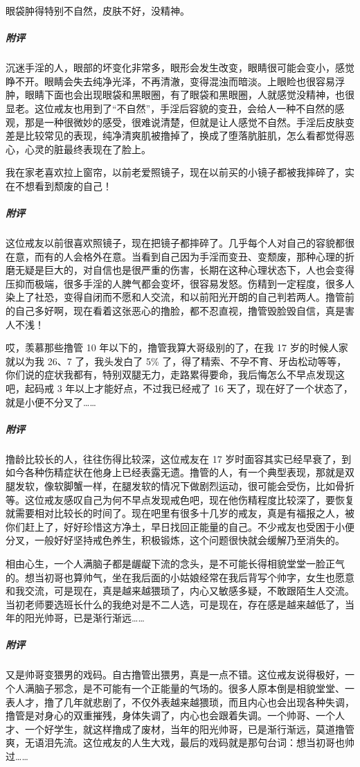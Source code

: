 \begin{case}[变丑]
    眼袋肿得特别不自然，皮肤不好，没精神。
    \subparagraph{附评} 沉迷手淫的人，眼部的坏变化非常多，眼形会发生改变，眼睛很可能会变小，感觉睁不开。眼睛会失去纯净光泽，不再清澈，变得混浊而暗淡。上眼睑也很容易浮肿，眼睛下面也会出现眼袋和黑眼圈，有了眼袋和黑眼圈，人就感觉没精神，也很显老。这位戒友也用到了“不自然”，手淫后容貌的变丑，会给人一种不自然的感观，那是一种很微妙的感受，很难说清楚，但就是让人感觉不自然。手淫后皮肤变差是比较常见的表现，纯净清爽肌被撸掉了，换成了堕落肮脏肌，怎么看都觉得恶心，心灵的脏最终表现在了脸上。
\end{case}

\begin{case}[变丑]
    我在家老喜欢拉上窗帘，以前老爱照镜子，现在以前买的小镜子都被我摔碎了，实在不想看到颓废的自己！
    \subparagraph{附评} 这位戒友以前很喜欢照镜子，现在把镜子都摔碎了。几乎每个人对自己的容貌都很在意，而有的人会格外在意。当看到自己因为手淫而变丑、变颓废，那种心理的折磨无疑是巨大的，对自信也是很严重的伤害，长期在这种心理状态下，人也会变得压抑而极端，很多手淫的人脾气都会变坏，很容易发怒。伤精到一定程度，很多人染上了社恐，变得自闭而不愿和人交流，和以前阳光开朗的自己判若两人。撸管前的自己多好啊，现在看着这张恶心的撸脸，都不忍直视，撸管毁脸毁自信，真是害人不浅！
\end{case}

\begin{case}[变丑]
    哎，羡慕那些撸管 10 年以下的，撸管我算大哥级别的了，在我 17 岁的时候人家就以为我 26、7 了，我头发白了 5\% 了，得了精索、不孕不育、牙齿松动等等，你们说的症状我都有，特别双腿无力，走路累得要命，我后悔怎么不早点发现这吧，起码戒 3 年以上才能好点，不过我已经戒了 16 天了，现在好了一个状态了，就是小便不分叉了……
    \subparagraph{附评} 撸龄比较长的人，往往伤得比较深，这位戒友在 17 岁时面容其实已经早衰了，到如今各种伤精症状在他身上已经表露无遗。撸管的人，有一个典型表现，那就是双腿发软，像软脚蟹一样，在腿发软的情况下做剧烈运动，很可能会受伤，比如骨折等。这位戒友感叹自己为何不早点发现戒色吧，现在他伤精程度比较深了，要恢复就需要相对比较长的时间了。现在吧里有很多十几岁的戒友，真是有福报之人，被你们赶上了，好好珍惜这方净土，早日找回正能量的自己。不少戒友也受困于小便分叉，一般好好坚持戒色养生，积极锻炼，这个问题很快就会缓解乃至消失的。
\end{case}

\begin{case}[变丑]
    相由心生，一个人满脑子都是龌龊下流的念头，是不可能长得相貌堂堂一脸正气的。想当初哥也算帅气，坐在我后面的小姑娘经常在我后背写个帅字，女生也愿意和我交流，可是现在，真是越来越猥琐了，内心又敏感多疑，不敢跟陌生人交流。当初老师要选班长什么的我绝对是不二人选，可是现在，存在感是越来越低了，当年的阳光帅哥，已是渐行渐远……
    \subparagraph{附评} 又是帅哥变猥男的戏码。自古撸管出猥男，真是一点不错。这位戒友说得极好，一个人满脑子邪念，是不可能有一个正能量的气场的。很多人原本倒是相貌堂堂、一表人才，撸了几年就悲剧了，不仅外表越来越猥琐，而且内心也会出现各种失调，撸管是对身心的双重摧残，身体失调了，内心也会跟着失调。一个帅哥、一个人才、一个好学生，就这样撸成了废材，当年的阳光帅哥，已是渐行渐远，莫道撸管爽，无语泪先流。这位戒友的人生大戏，最后的戏码就是那句台词：想当初哥也帅过……
\end{case}


